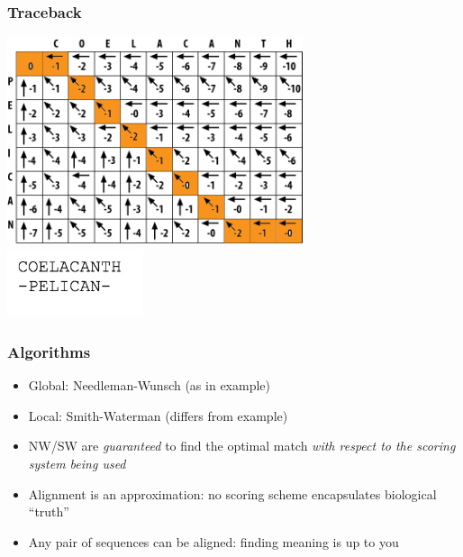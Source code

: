 \documentclass[table]{beamer}
\begin{document}
    \begin{frame}
     \frametitle{Traceback}
       \begin{center}
         \includegraphics[width=0.65\textwidth]{images/traceback} \\
         \includegraphics[width=0.3\textwidth]{images/traceback_sequence}         
       \end{center}
    \end{frame}     

    \begin{frame}
     \frametitle{Algorithms}
       \begin{itemize}
         \item<1-> Global: Needleman-Wunsch (as in example)
         \item<1-> Local: Smith-Waterman (differs from example)
         \item<2-> NW/SW are \emph{guaranteed} to find the optimal match \emph{with respect to the scoring system being used}
         \item<2-> Alignment is an approximation: no scoring scheme encapsulates biological ``truth''
         \item<2-> Any pair of sequences can be aligned: finding meaning is up to you
       \end{itemize}
    \end{frame}   
\end{document}
